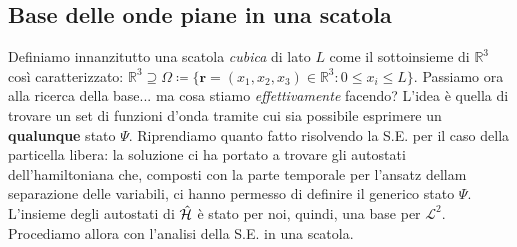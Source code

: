 \subsection{Base delle onde piane in una scatola}
Definiamo innanzitutto una scatola \emph{cubica} di lato $L$ come il sottoinsieme di $\mathbb{R}^3$ così caratterizzato: $\mathbb{R}^3 \supseteq \Omega \coloneq \{ \bm{r} = (x_1,x_2,x_3) \in \mathbb{R}^3 : 0 \leq x_i \leq L \}$. Passiamo ora alla ricerca della base... ma cosa stiamo \emph{effettivamente} facendo? L'idea è quella di trovare un set di funzioni d'onda tramite cui sia possibile esprimere un \textbf{qualunque} stato $\Psi$. Riprendiamo quanto fatto risolvendo la S.E. per il caso della particella libera: la soluzione ci ha portato a trovare gli autostati dell'hamiltoniana che, composti con la parte temporale per l'ansatz dellam separazione delle variabili, ci hanno permesso di definire il generico stato $\Psi$. L'insieme degli autostati di $\hat{\mathcal{H}}$ è stato per noi, quindi, una base per $\mathcal{L}^2$. Procediamo allora con l'analisi della S.E. in una scatola. 

